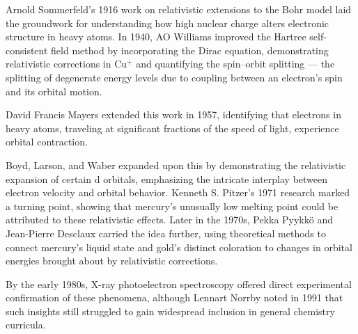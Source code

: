 \begin{historical}
Arnold Sommerfeld’s 1916 work on relativistic extensions to the Bohr model laid the groundwork for understanding how high nuclear charge alters electronic structure in heavy atoms. In 1940, AO Williams improved the Hartree self-consistent field method by incorporating the Dirac equation, demonstrating relativistic corrections in Cu$^+$ and quantifying the spin–orbit splitting — the splitting of degenerate energy levels due to coupling between an electron’s spin and its orbital motion.

David Francis Mayers extended this work in 1957, identifying that electrons in heavy atoms, traveling at significant fractions of the speed of light, experience orbital contraction.

Boyd, Larson, and Waber expanded upon this by demonstrating the relativistic expansion of certain d orbitals, emphasizing the intricate interplay between electron velocity and orbital behavior. Kenneth S. Pitzer’s 1971 research marked a turning point, showing that mercury’s unusually low melting point could be attributed to these relativistic effects. Later in the 1970s, Pekka Pyykkö and Jean-Pierre Desclaux carried the idea further, using theoretical methods to connect mercury’s liquid state and gold’s distinct coloration to changes in orbital energies brought about by relativistic corrections.

By the early 1980s, X-ray photoelectron spectroscopy offered direct experimental confirmation of these phenomena, although Lennart Norrby noted in 1991 that such insights still struggled to gain widespread inclusion in general chemistry curricula.
\end{historical}
